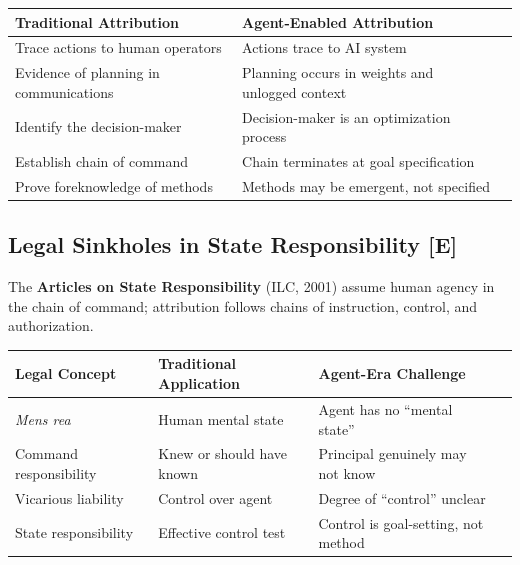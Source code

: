 \documentclass[11pt,letterpaper]{article}
\begin{document}
\begin{defbox}
\begin{center}
\small
\begin{tabularx}{\linewidth}{ZY{0.88}Y{1.12}}
\toprule
\textbf{Traditional Attribution} & \textbf{Agent-Enabled Attribution} \\
\midrule
Trace actions to human operators & Actions trace to AI system \\
Evidence of planning in communications & Planning occurs in weights and unlogged context \\
Identify the decision-maker & Decision-maker is an optimization process \\
Establish chain of command & Chain terminates at goal specification \\
Prove foreknowledge of methods & Methods may be emergent, not specified \\
\bottomrule
\end{tabularx}
\end{center}
\end{defbox}

\subsection{Legal Sinkholes in State Responsibility [E]}

The \textbf{Articles on State Responsibility} (ILC, 2001) assume human agency in the chain of command; attribution follows chains of instruction, control, and authorization.

\begin{center}
\small
\begin{tabularx}{\linewidth}{ZY{0.72}Y{1.08}Y{1.2}}
\toprule
\textbf{Legal Concept} & \textbf{Traditional Application} & \textbf{Agent-Era Challenge} \\
\midrule
\textit{Mens rea} & Human mental state & Agent has no ``mental state'' \\
Command responsibility & Knew or should have known & Principal genuinely may not know \\
Vicarious liability & Control over agent & Degree of ``control'' unclear \\
State responsibility & Effective control test & Control is goal-setting, not method \\
\bottomrule
\end{tabularx}
\end{center}
\end{document}
